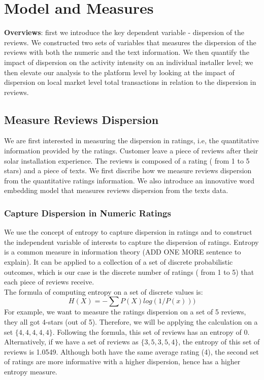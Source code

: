 \documentclass[msom,blindrev]{informs3}
\begin{document}
\section{Model and Measures}
\textbf{Overviews}: first we introduce the key dependent variable - dispersion of the reviews. We constructed two sets of variables that measures the dispersion of the reviews with both the numeric and the text information. We then quantify the impact of dispersion on the activity intensity on an individual installer level; we then elevate our analysis to the platform level by looking at the impact of dispersion on local market level total transactions in relation to the dispersion in reviews.

\subsection{Measure Reviews Dispersion}
\label{subsection_measure_dispersion}
We are first interested in measuring the dispersion in ratings, i.e, the quantitative information provided by the ratings. Customer leave a piece of reviews after their solar installation experience. The reviews is composed of a rating ( from 1 to 5 stars) and a piece of texts. We first discribe how we measure reviews dispersion from the quantitative ratings information. We also introduce an innovative word embedding model that measures reviews dispersion from the texts data.
\subsubsection{Capture Dispersion in Numeric Ratings}
We use the concept of entropy to capture dispersion in ratings and to construct the independent variable of interests to capture the dispersion of ratings. Entropy is a common measure in information theory (ADD ONE MORE sentence to explain). It can be applied to a collection of a set of discrete probabilistic outcomes, which is our case is the discrete number of ratings ( from 1 to 5) that each piece of reviews receive. \\
The formula of computing entropy on a set of discrete values is:  \\
\begin{equation}
H(X)=-\sum P(X)log(1/P(x)))
\end{equation}
For example, we want to measure the ratings dispersion on a set of 5 reviews, they all got 4-stars (out of 5). Therefore, we will be applying the calculation on a set $\{4,4,4,4,4\}$. Following the formula, this set of reviews has an entropy of 0. Alternatively, if we have a set of reviews as $\{3,5,3,5,4\}$, the entropy of this set of reviews is 1.0549.  Although both have the same average rating (4), the second set of ratings are more informative with a higher dispersion, hence has a higher entropy measure. \\
\end{document}
